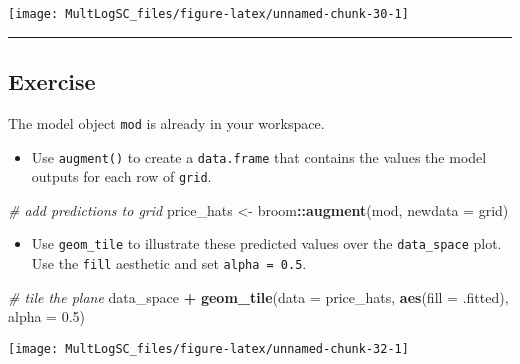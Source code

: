 \documentclass[
]{book}
\newenvironment{Shaded}{\begin{snugshade}}{\end{snugshade}}
\newcommand{\CommentTok}[1]{\textcolor[rgb]{0.56,0.35,0.01}{\textit{#1}}}
\newcommand{\DataTypeTok}[1]{\textcolor[rgb]{0.13,0.29,0.53}{#1}}
\newcommand{\FloatTok}[1]{\textcolor[rgb]{0.00,0.00,0.81}{#1}}
\newcommand{\KeywordTok}[1]{\textcolor[rgb]{0.13,0.29,0.53}{\textbf{#1}}}
\newcommand{\NormalTok}[1]{#1}
\newcommand{\OperatorTok}[1]{\textcolor[rgb]{0.81,0.36,0.00}{\textbf{#1}}}
\newcommand{\StringTok}[1]{\textcolor[rgb]{0.31,0.60,0.02}{#1}}
\providecommand{\tightlist}{%
  \setlength{\itemsep}{0pt}\setlength{\parskip}{0pt}}
\begin{document}
\begin{center}\texttt{[image: MultLogSC\_files/figure-latex/unnamed-chunk-30-1]} \end{center}

\begin{center}\rule{0.5\linewidth}{0.5pt}\end{center}

\hypertarget{exercise-9}{%
\subsection*{Exercise}\label{exercise-9}}

The model object \texttt{mod} is already in your workspace.

\begin{itemize}
\tightlist
\item
  Use \texttt{augment()} to create a \texttt{data.frame} that contains the values the model outputs for each row of \texttt{grid}.
\end{itemize}

\begin{Shaded}
\begin{Highlighting}[]
\CommentTok{# add predictions to grid}
\NormalTok{price_hats <-}\StringTok{ }\NormalTok{broom}\OperatorTok{::}\KeywordTok{augment}\NormalTok{(mod, }\DataTypeTok{newdata =}\NormalTok{ grid)}
\end{Highlighting}
\end{Shaded}

\begin{itemize}
\tightlist
\item
  Use \texttt{geom\_tile} to illustrate these predicted values over the \texttt{data\_space} plot. Use the \texttt{fill} aesthetic and set \texttt{alpha\ =\ 0.5}.
\end{itemize}

\begin{Shaded}
\begin{Highlighting}[]
\CommentTok{# tile the plane}
\NormalTok{data_space }\OperatorTok{+}\StringTok{ }
\StringTok{   }\KeywordTok{geom_tile}\NormalTok{(}\DataTypeTok{data =}\NormalTok{ price_hats, }
             \KeywordTok{aes}\NormalTok{(}\DataTypeTok{fill =}\NormalTok{ .fitted), }\DataTypeTok{alpha =} \FloatTok{0.5}\NormalTok{)}
\end{Highlighting}
\end{Shaded}

\begin{center}\texttt{[image: MultLogSC\_files/figure-latex/unnamed-chunk-32-1]} \end{center}
\end{document}
